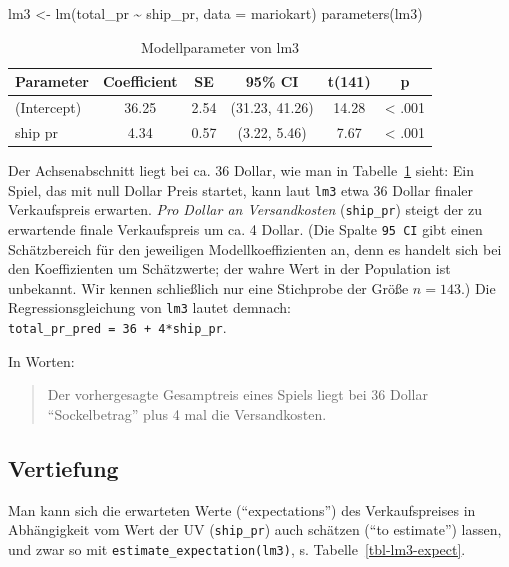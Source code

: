 \documentclass[
  letterpaper,
  twoside,
  open=any]{scrbook}
\newenvironment{Shaded}{\begin{snugshade}}{\end{snugshade}}
\newcommand{\AttributeTok}[1]{\textcolor[rgb]{0.40,0.45,0.13}{#1}}
\newcommand{\FunctionTok}[1]{\textcolor[rgb]{0.28,0.35,0.67}{#1}}
\newcommand{\NormalTok}[1]{\textcolor[rgb]{0.00,0.23,0.31}{#1}}
\newcommand{\OtherTok}[1]{\textcolor[rgb]{0.00,0.23,0.31}{#1}}
\newcommand{\SpecialCharTok}[1]{\textcolor[rgb]{0.37,0.37,0.37}{#1}}
\theoremstyle{definition}
\theoremstyle{definition}
\theoremstyle{definition}
\theoremstyle{remark}
\begin{document}
\begin{Shaded}
\begin{Highlighting}[]
\NormalTok{lm3 }\OtherTok{\textless{}{-}} \FunctionTok{lm}\NormalTok{(total\_pr }\SpecialCharTok{\textasciitilde{}}\NormalTok{ ship\_pr, }\AttributeTok{data =}\NormalTok{ mariokart)}
\FunctionTok{parameters}\NormalTok{(lm3)}
\end{Highlighting}
\end{Shaded}

\begin{longtable}[]{@{}lccccc@{}}

\caption{\label{tbl-lm3}Modellparameter von lm3}

\tabularnewline

\toprule\noalign{}
Parameter & Coefficient & SE & 95\% CI & t(141) & p \\
\midrule\noalign{}
\endhead
\bottomrule\noalign{}
\endlastfoot
(Intercept) & 36.25 & 2.54 & (31.23, 41.26) & 14.28 & \textless{}
.001 \\
ship pr & 4.34 & 0.57 & (3.22, 5.46) & 7.67 & \textless{} .001 \\

\end{longtable}

Der Achsenabschnitt liegt bei ca. 36 Dollar, wie man in
Tabelle~\ref{tbl-lm3} sieht: Ein Spiel, das mit null Dollar Preis
startet, kann laut \texttt{lm3} etwa 36 Dollar finaler Verkaufspreis
erwarten. \emph{Pro Dollar an Versandkosten} (\texttt{ship\_pr}) steigt
der zu erwartende finale Verkaufspreis um ca. 4 Dollar. (Die Spalte
\texttt{95\ CI} gibt einen Schätzbereich für den jeweiligen
Modellkoeffizienten an, denn es handelt sich bei den Koeffizienten um
Schätzwerte; der wahre Wert in der Population ist unbekannt. Wir kennen
schließlich nur eine Stichprobe der Größe \(n = 143\).) Die
Regressionsgleichung von \texttt{lm3} lautet demnach:
\texttt{total\_pr\_pred\ =\ 36\ +\ 4*ship\_pr}.

In Worten:

\begin{quote}
Der vorhergesagte Gesamptreis eines Spiels liegt bei 36 Dollar
\enquote{Sockelbetrag} plus 4 mal die Versandkosten.
\end{quote}

\subsection{Vertiefung}\label{vertiefung-5}

Man kann sich die erwarteten Werte (\enquote{expectations}) des
Verkaufspreises in Abhängigkeit vom Wert der UV (\texttt{ship\_pr}) auch
schätzen (\enquote{to estimate}) lassen, und zwar so mit
\texttt{estimate\_expectation(lm3)}, s. Tabelle~\ref{tbl-lm3-expect}.
\end{document}
